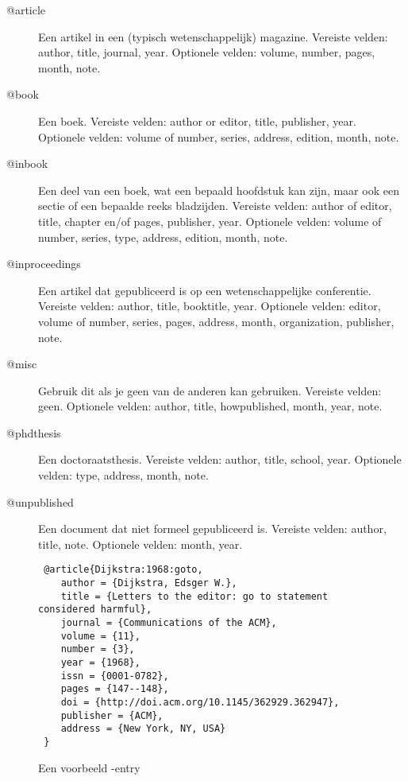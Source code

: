 \documentclass[12pt, dutch]{article}
\begin{document}
\begin{description}

  \item[@article] Een artikel in een (typisch wetenschappelijk)
        magazine. Vereiste velden: author, title, journal, year. Optionele
        velden: volume, number, pages, month, note.

  \item[@book] Een boek. Vereiste velden: author
        or editor, title, publisher, year. Optionele velden: volume of
        number, series, address, edition, month, note.

  \item[@inbook] Een deel van een boek, wat een bepaald hoofdstuk kan zijn, maar ook een
        sectie of een bepaalde reeks bladzijden. Vereiste velden: author of
        editor, title, chapter en/of pages, publisher, year. Optionele
        velden: volume of number, series, type, address, edition, month,
        note.

  \item[@inproceedings] Een artikel dat gepubliceerd is op een
        wetenschappelijke conferentie. Vereiste velden: author, title,
        booktitle, year. Optionele velden: editor, volume of number, series,
        pages, address, month, organization, publisher, note.

  \item[@misc] Gebruik dit als je geen van de anderen kan gebruiken.
        Vereiste velden: geen. Optionele velden: author, title,
        howpublished, month, year, note.

  \item[@phdthesis] Een doctoraatsthesis. Vereiste velden: author, title, school,
        year. Optionele velden: type, address, month, note.

  \item[@unpublished] Een document dat niet formeel gepubliceerd is. Vereiste velden: author, title, note.
        Optionele velden: month, year.

\end{description}

\begin{figure}
  \begin{verbatim}
 @article{Dijkstra:1968:goto,
    author = {Dijkstra, Edsger W.},
    title = {Letters to the editor: go to statement considered harmful},
    journal = {Communications of the ACM},
    volume = {11},
    number = {3},
    year = {1968},
    issn = {0001-0782},
    pages = {147--148},
    doi = {http://doi.acm.org/10.1145/362929.362947},
    publisher = {ACM},
    address = {New York, NY, USA}
 }
\end{verbatim}
  \caption{Een voorbeeld \BibTeX-entry}\label{fig:bibtexexample}
\end{figure}
\end{document}
